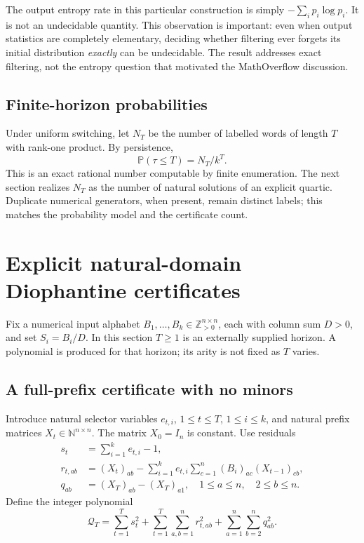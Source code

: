 \documentclass[11pt,letterpaper]{article}
\theoremstyle{definition}
\theoremstyle{remark}
\newcommand{\N}{\mathbb N}
\newcommand{\Z}{\mathbb Z}
\newcommand{\PP}{\mathbb P}
\begin{document}
The output entropy rate in this particular construction is simply
$-\sum_i p_i\log p_i$. It is not an undecidable quantity. This observation is
important: even when output statistics are completely elementary, deciding
whether filtering ever forgets its initial distribution \emph{exactly} can be
undecidable. The result addresses exact filtering, not the entropy question that
motivated the MathOverflow discussion.

\subsection{Finite-horizon probabilities}

Under uniform switching, let $N_T$ be the number of labelled words of length $T$
with rank-one product. By persistence,
\begin{equation}
 \PP(\tau\leq T)=N_T/k^T.
 \label{ste:ee:eq:probcount}
\end{equation}
This is an exact rational number computable by finite enumeration. The next
section realizes $N_T$ as the number of natural solutions of an explicit quartic.
Duplicate numerical generators, when present, remain distinct labels; this
matches the probability model and the certificate count.

\section{Explicit natural-domain Diophantine certificates}
\label{ste:ee:sec:quartic}

Fix a numerical input alphabet $B_1,\ldots,B_k\in\Z_{>0}^{n\times n}$, each
with column sum $D>0$, and set $S_i=B_i/D$. In this section $T\geq1$ is an
externally supplied horizon. A polynomial is produced for that horizon; its
arity is not fixed as $T$ varies.

\subsection{A full-prefix certificate with no minors}

Introduce natural selector variables $e_{t,i}$, $1\leq t\leq T$, $1\leq i\leq k$,
and natural prefix matrices $X_t\in\N^{n\times n}$. The matrix $X_0=I_n$ is
constant. Use residuals
\begin{align}
 s_t&=\sum_{i=1}^k e_{t,i}-1,\label{ste:ee:eq:selector}\\
 r_{t,ab}&=(X_t)_{ab}-\sum_{i=1}^k e_{t,i}
                   \sum_{c=1}^n(B_i)_{ac}(X_{t-1})_{cb},\label{ste:ee:eq:prefix}\\
 q_{ab}&=(X_T)_{ab}-(X_T)_{a1},\quad 1\leq a\leq n,\quad 2\leq b\leq n.
 \label{ste:ee:eq:terminal}
\end{align}
Define the integer polynomial
\begin{equation}
 \mathcal Q_T=\sum_{t=1}^T s_t^2+
 \sum_{t=1}^T\sum_{a,b=1}^n r_{t,ab}^2+
 \sum_{a=1}^n\sum_{b=2}^n q_{ab}^2.
 \label{ste:ee:eq:fullquartic}
\end{equation}
\end{document}
